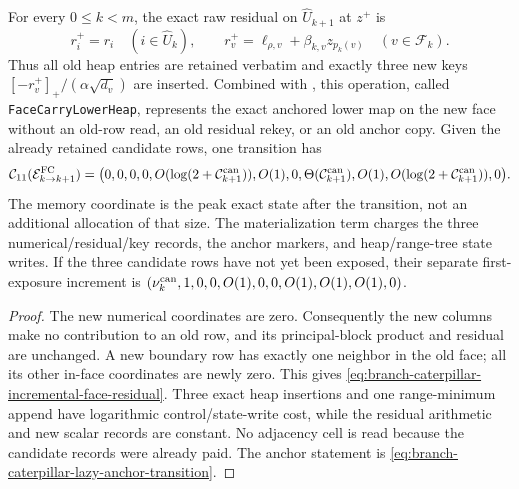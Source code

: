 \begin{lemma}
\label{lem:branch-caterpillar-incremental-face-transition}
For every $0\leq k<m$, the exact raw residual on
$\widehat U_{k+1}$ at $z^+$ is
\begin{equation}
 r_i^+=r_i\quad(i\in\widehat U_k),
 \qquad
 r_v^+=\ell_{\rho,v}+\beta_{k,v}z_{p_k(v)}
       \quad(v\in\mathcal F_k).
 \label{eq:branch-caterpillar-incremental-face-residual}
\end{equation}
Thus all old heap entries are retained verbatim and exactly three new keys
$[-r_v^+]_+/(\alpha\sqrt{d_v})$ are inserted.  Combined with
, this operation, called
\texttt{FaceCarryLowerHeap}, represents the exact anchored lower map on the
new face without an old-row read, an old residual rekey, or an old anchor
copy.  Given the already retained candidate rows, one transition has
\begin{equation}
 \mathcal C_{11}(\mathcal E_{k\to k+1}^{\rm FC})=
 \bigl(0,0,0,0,O(\log(2+\mathcal C_{k+1}^{\rm can})),O(1),0,
 \Theta(\mathcal C_{k+1}^{\rm can}),O(1),
 O(\log(2+\mathcal C_{k+1}^{\rm can})),0\bigr).
 \label{eq:branch-caterpillar-incremental-face-transition-vector}
\end{equation}
The memory coordinate is the peak exact state after the transition, not an
additional allocation of that size.  The materialization term charges the
three numerical/residual/key records, the anchor markers, and heap/range-tree
state writes.  If the three candidate rows have not yet been exposed, their
separate first-exposure increment is
$(\nu_k^{\rm can},1,0,0,O(1),0,0,O(1),O(1),O(1),0)$.
\end{lemma}

\begin{proof}
The new numerical coordinates are zero.  Consequently the new columns make
no contribution to an old row, and its principal-block product and residual
are unchanged.  A new boundary row has exactly one neighbor in the old face;
all its other in-face coordinates are newly zero.  This gives
\cref{eq:branch-caterpillar-incremental-face-residual}.  Three exact heap
insertions and one range-minimum append have logarithmic control/state-write
cost, while the residual arithmetic and new scalar records are constant.
No adjacency cell is read because the candidate records were already paid.
The anchor statement is
\cref{eq:branch-caterpillar-lazy-anchor-transition}.
\end{proof}

